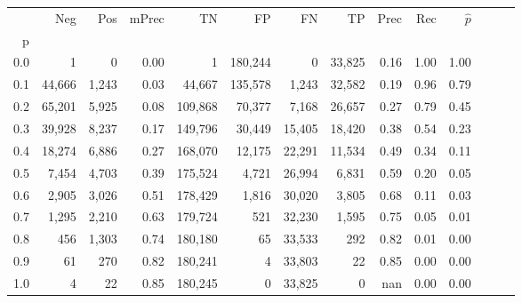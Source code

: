 \begin{tabular}{rrrrrrrrrrrrrr}
\toprule
{} &     Neg &    Pos & mPrec &       TN &       FP &      FN &      TP &  Prec &   Rec & $\hat{p}$ \\
p   &         &        &       &          &          &         &         &       &       &           \\
\midrule
0.0 &       1 &      0 &  0.00 &        1 &  180,244 &       0 &  33,825 &  0.16 &  1.00 &      1.00 \\
0.1 &  44,666 &  1,243 &  0.03 &   44,667 &  135,578 &   1,243 &  32,582 &  0.19 &  0.96 &      0.79 \\
0.2 &  65,201 &  5,925 &  0.08 &  109,868 &   70,377 &   7,168 &  26,657 &  0.27 &  0.79 &      0.45 \\
0.3 &  39,928 &  8,237 &  0.17 &  149,796 &   30,449 &  15,405 &  18,420 &  0.38 &  0.54 &      0.23 \\
0.4 &  18,274 &  6,886 &  0.27 &  168,070 &   12,175 &  22,291 &  11,534 &  0.49 &  0.34 &      0.11 \\
0.5 &   7,454 &  4,703 &  0.39 &  175,524 &    4,721 &  26,994 &   6,831 &  0.59 &  0.20 &      0.05 \\
0.6 &   2,905 &  3,026 &  0.51 &  178,429 &    1,816 &  30,020 &   3,805 &  0.68 &  0.11 &      0.03 \\
0.7 &   1,295 &  2,210 &  0.63 &  179,724 &      521 &  32,230 &   1,595 &  0.75 &  0.05 &      0.01 \\
0.8 &     456 &  1,303 &  0.74 &  180,180 &       65 &  33,533 &     292 &  0.82 &  0.01 &      0.00 \\
0.9 &      61 &    270 &  0.82 &  180,241 &        4 &  33,803 &      22 &  0.85 &  0.00 &      0.00 \\
1.0 &       4 &     22 &  0.85 &  180,245 &        0 &  33,825 &       0 &   nan &  0.00 &      0.00 \\
\bottomrule
\end{tabular}
